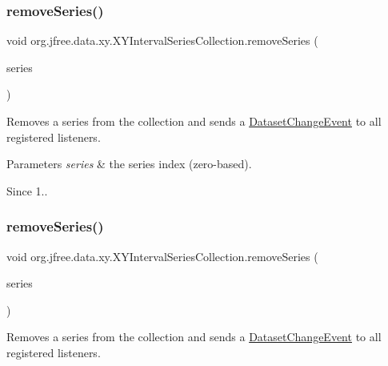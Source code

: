 \subsubsection{\texorpdfstring{remove\+Series()}{removeSeries()}\hspace{0.1cm}{\footnotesize\ttfamily [1/2]}}
{\footnotesize\ttfamily void org.\+jfree.\+data.\+xy.\+X\+Y\+Interval\+Series\+Collection.\+remove\+Series (\begin{DoxyParamCaption}\item[{int}]{series }\end{DoxyParamCaption})}

Removes a series from the collection and sends a \mbox{\hyperlink{}{Dataset\+Change\+Event}} to all registered listeners.


\begin{DoxyParams}{Parameters}
{\em series} & the series index (zero-\/based).\\
\hline
\end{DoxyParams}
\begin{DoxySince}{Since}
1.. 
\end{DoxySince}
\mbox{\label{classorg_1_1jfree_1_1data_1_1xy_1_1_x_y_interval_series_collection_a8a84bd74eee4edbc30c98257d54a9f76}} 
\subsubsection{\texorpdfstring{remove\+Series()}{removeSeries()}\hspace{0.1cm}{\footnotesize\ttfamily [2/2]}}
{\footnotesize\ttfamily void org.\+jfree.\+data.\+xy.\+X\+Y\+Interval\+Series\+Collection.\+remove\+Series (\begin{DoxyParamCaption}\item[{\mbox{\hyperlink{classorg_1_1jfree_1_1data_1_1xy_1_1_x_y_interval_series}{X\+Y\+Interval\+Series}}}]{series }\end{DoxyParamCaption})}

Removes a series from the collection and sends a \mbox{\hyperlink{}{Dataset\+Change\+Event}} to all registered listeners.


